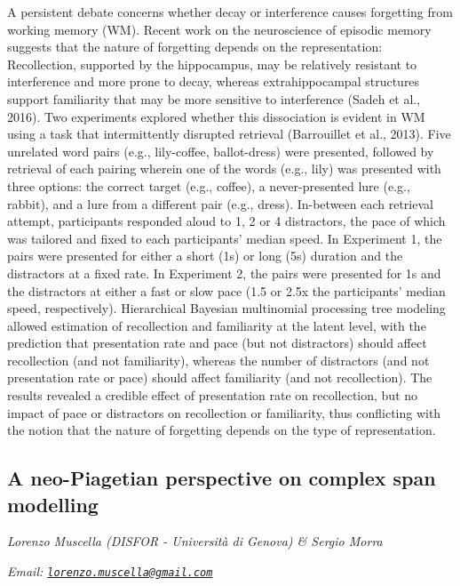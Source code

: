 \documentclass[
  12pt,
]{book}
\begin{document}
A persistent debate concerns whether decay or interference causes forgetting from working memory (WM). Recent work on the neuroscience of episodic memory suggests that the nature of forgetting depends on the representation: Recollection, supported by the hippocampus, may be relatively resistant to interference and more prone to decay, whereas extrahippocampal structures support familiarity that may be more sensitive to interference (Sadeh et al., 2016). Two experiments explored whether this dissociation is evident in WM using a task that intermittently disrupted retrieval (Barrouillet et al., 2013). Five unrelated word pairs (e.g., lily-coffee, ballot-dress) were presented, followed by retrieval of each pairing wherein one of the words (e.g., lily) was presented with three options: the correct target (e.g., coffee), a never-presented lure (e.g., rabbit), and a lure from a different pair (e.g., dress). In-between each retrieval attempt, participants responded aloud to 1, 2 or 4 distractors, the pace of which was tailored and fixed to each participants' median speed. In Experiment 1, the pairs were presented for either a short (1s) or long (5s) duration and the distractors at a fixed rate. In Experiment 2, the pairs were presented for 1s and the distractors at either a fast or slow pace (1.5 or 2.5x the participants' median speed, respectively). Hierarchical Bayesian multinomial processing tree modeling allowed estimation of recollection and familiarity at the latent level, with the prediction that presentation rate and pace (but not distractors) should affect recollection (and not familiarity), whereas the number of distractors (and not presentation rate or pace) should affect familiarity (and not recollection). The results revealed a credible effect of presentation rate on recollection, but no impact of pace or distractors on recollection or familiarity, thus conflicting with the notion that the nature of forgetting depends on the type of representation.

\hypertarget{a-neo-piagetian-perspective-on-complex-span-modelling}{%
\subsection{A neo-Piagetian perspective on complex span modelling}\label{a-neo-piagetian-perspective-on-complex-span-modelling}}

\emph{Lorenzo Muscella (DISFOR - Università di Genova) \& Sergio Morra}

\emph{Email: \href{mailto:lorenzo.muscella@gmail.com}{\nolinkurl{lorenzo.muscella@gmail.com}}}
\end{document}
